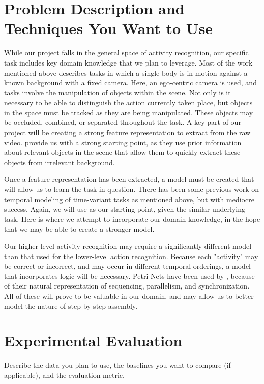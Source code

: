 \documentclass[10pt,letterpaper]{article}
\begin{document}
\section{Problem Description and Techniques You Want to Use}

While our project falls in the general space of activity recognition, our specific task includes key domain knowledge that we plan to leverage. Most of the work mentioned above describes tasks in which a single body is in motion against a known background with a fixed camera. Here, an ego-centric camera is used, and tasks involve the manipulation of objects within the scene. Not only is it necessary to be able to distinguish the action currently taken place, but objects in the space must be tracked as they are being manipulated. These objects may be occluded, combined, or separated throughout the task. A key part of our project will be creating a strong feature representation to extract from the raw video. \cite{starner1998real} provide us with a strong starting point, as they use prior information about relevant objects in the scene that allow them to quickly extract these objects from irrelevant background. 

Once a feature representation has been extracted, a model must be created that will allow us to learn the task in question. There has been some previous work on temporal modeling of time-variant tasks as mentioned above, but with mediocre success. Again, we will use \cite{starner1998real} as our starting point, given the similar underlying task. Here is where we attempt to incorporate our domain knowledge, in the hope that we may be able to create a stronger model.

Our higher level activity recognition may require a significantly different model than that used for the lower-level action recognition. Because each "activity" may be correct or incorrect, and may occur in different temporal orderings, a model that incorporates logic will be necessary. Petri-Nets have been used by \cite{castel1996going}, because of their natural representation of sequencing, parallelism, and synchronization. All of these will prove to be valuable in our domain, and may allow us to better model the nature of step-by-step assembly.

\section{Experimental Evaluation}
 

Describe the data you plan to use, the baselines you want to compare (if applicable), and the evaluation metric.
\end{document}
